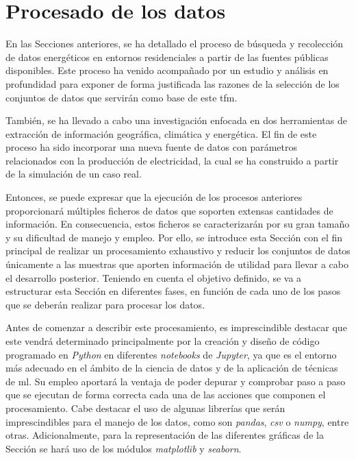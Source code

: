 \section{Procesado de los datos}
\label{sec:preprocesado}

En las Secciones anteriores, se ha detallado el proceso de búsqueda y recolección de datos energéticos en entornos residenciales a partir de las fuentes públicas disponibles. Este proceso ha venido acompañado por un estudio y análisis en profundidad para exponer de forma justificada las razones de la selección de los conjuntos de datos que servirán como base de este \gls{tfm}. 

\vspace{3mm}

También, se ha llevado a cabo una investigación enfocada en dos herramientas de extracción de información geográfica, climática y energética. El fin de este proceso ha sido incorporar una nueva fuente de datos con parámetros relacionados con la producción de electricidad, la cual se ha construido a partir de la simulación de un caso real.

\vspace{3mm}

Entonces, se puede expresar que la ejecución de los procesos anteriores proporcionará múltiples ficheros de datos que soporten extensas cantidades de información. En consecuencia, estos ficheros se caracterizarán por su gran tamaño y su dificultad de manejo y empleo. Por ello, se introduce esta Sección con el fin principal de realizar un procesamiento exhaustivo y reducir los conjuntos de datos únicamente a las muestras que aporten información de utilidad para llevar a cabo el desarrollo posterior. Teniendo en cuenta el objetivo definido, se va a estructurar esta Sección en diferentes fases, en función de cada uno de los pasos que se deberán realizar para procesar los datos.

\vspace{3mm}

Antes de comenzar a describir este procesamiento, es imprescindible destacar que este vendrá determinado principalmente por la creación y diseño de código programado en \textit{Python} en diferentes \textit{notebooks} de \textit{Jupyter}, ya que es el entorno más adecuado en el ámbito de la ciencia de datos y de la aplicación de técnicas de \gls{ml}. Su empleo aportará la ventaja de poder depurar y comprobar paso a paso que se ejecutan de forma correcta cada una de las acciones que componen el procesamiento. Cabe destacar el uso de algunas librerías que serán imprescindibles para el manejo de los datos, como son \textit{pandas}, \textit{csv} o \textit{numpy}, entre otras. Adicionalmente, para la representación de las diferentes gráficas de la Sección se hará uso de los módulos \textit{matplotlib} y \textit{seaborn}.


